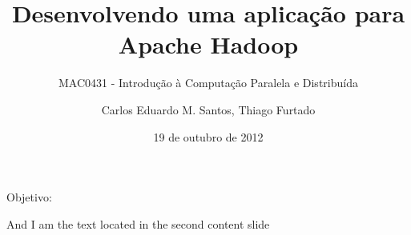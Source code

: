 \documentclass{beamer}
\title{Desenvolvendo uma aplicação para Apache Hadoop}
\subtitle{MAC0431 - Introdução à Computação Paralela e Distribuída}
\author{Carlos Eduardo M. Santos, Thiago Furtado}\institute{Universidade de São Paulo - IME}
\date{19 de outubro de 2012}
\begin{document}
\begin{frame}
\titlepage
\end{frame}

\begin{frame}
Objetivo: 
\end{frame}

\begin{frame}
And I am the text located in the second content slide
\end{frame}
\end{document}
